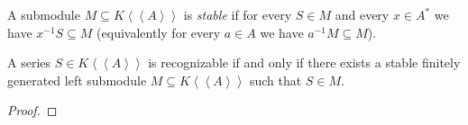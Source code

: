 \begin{definition}
    A submodule $M \subseteq K \left<\left<A\right>\right>$ is \emph{stable} 
    if for every $S \in M$ and every $x \in A^*$ we have $x^{-1}S \subseteq M$ (equivalently
    for every $a \in A$ we have $a^{-1}M \subseteq M$).
\end{definition}



\begin{theorem}
    A series $S \in K \left<\left<A\right>\right>$ is recognizable if and only 
    if there exists a stable finitely generated left submodule $M \subseteq 
    K \left<\left<A\right>\right>$ such that $S \in M$.
\end{theorem}
\begin{proof}
    
\end{proof}
